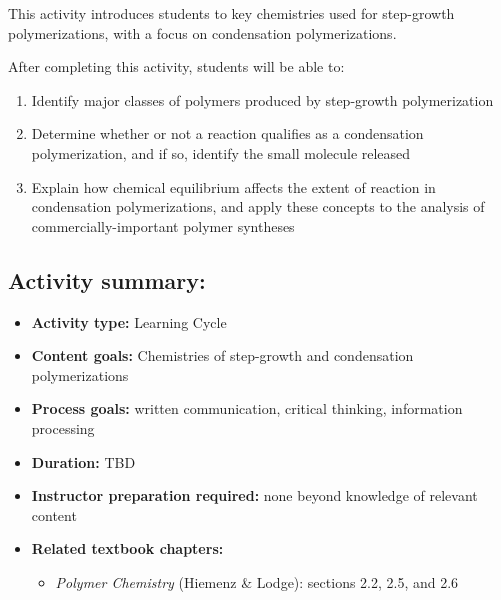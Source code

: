 %
%
%
%

\renewcommand{\figpath}{content/polymchem/stepgrowth/condensation-polyms/figs}

\begin{activity}

\begin{instructornotes}

	This activity introduces students to key chemistries used for step-growth polymerizations, with a focus on condensation polymerizations.
	
	After completing this activity, students will be able to:
			\begin{enumerate}
				\item Identify major classes of polymers produced by step-growth polymerization
				\item Determine whether or not a reaction qualifies as a condensation polymerization, and if so, identify the small molecule released
				\item Explain how chemical equilibrium affects the extent of reaction in condensation polymerizations, and apply these concepts to the analysis of commercially-important polymer syntheses
			\end{enumerate}
	
			
	\subsection*{Activity summary:}
	\begin{itemize}
		\item \textbf{Activity type:} Learning Cycle
		\item \textbf{Content goals:} Chemistries of step-growth and condensation polymerizations
		\item \textbf{Process goals:} %
			written communication, critical thinking, information processing
		\item \textbf{Duration:} TBD %
		\item \textbf{Instructor preparation required:} none beyond knowledge of relevant content
		\item \textbf{Related textbook chapters:}
			\begin{itemize}
				\item \emph{Polymer Chemistry} (Hiemenz \& Lodge): sections 2.2, 2.5, and 2.6
			\end{itemize}
	\end{itemize}


\end{instructornotes}
\end{activity}
